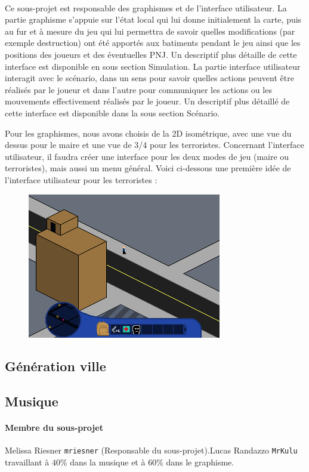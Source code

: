 \documentclass[a4paper,10pt]{article}
\begin{document}
\paragraph{} Ce sous-projet est responsable des graphismes et de l'interface utilisateur. 
La partie graphisme s'appuie sur l'état local qui lui donne initialement la carte, puis au fur et à mesure du jeu qui lui permettra de savoir quelles modifications (par exemple destruction) ont été apportés aux batiments pendant le jeu ainsi que les positions des joueurs et des éventuelles PNJ. Un descriptif plus détaille de cette interface est disponible en sous section Simulation.
La partie interface utilisateur interagit avec le scénario, dans un sens pour savoir quelles actions peuvent être réalisés par le joueur et dans l'autre pour communiquer les actions ou les mouvements effectivement réalisés par le joueur. Un descriptif plus détaillé de cette interface est disponible dans la sous section Scénario.

Pour les graphismes, nous avons choisis de la 2D isométrique, avec une vue du dessus pour le maire et une vue de 3/4 pour les terroristes. 
Concernant l'interface utilisateur, il faudra créer une interface pour les deux modes de jeu (maire ou terroristes), mais aussi un menu général. 
Voici ci-dessous une première idée de l'interface utilisateur pour les terroristes :
\begin{figure}[h]
\centering
 \includegraphics[width = 0.5\linewidth]{TS2014.png}
\end{figure}

\subsection{Génération ville}
\subsection{Musique} 
\paragraph{Membre du sous-projet} Melissa Riesner \verb!mriesner! (Responsable du sous-projet).Lucas Randazzo \verb!MrKulu! travaillant à $40\%$ dans la musique et à $60\%$ dans le graphisme. 
\end{document}
